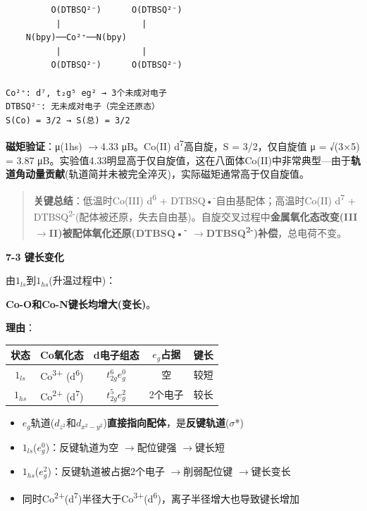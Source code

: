\documentclass[a4paper,11pt]{ctexart}
\providecommand{\tightlist}{\setlength{\itemsep}{0pt}\setlength{\parskip}{0pt}}
\newcounter{none}
\newcommand{\箭}{\ensuremath{\rightarrow}}
\newcommand{\左箭}{\ensuremath{\leftarrow}}
\newcommand{\上箭}{\ensuremath{\uparrow}}
\newcommand{\下箭}{\ensuremath{\downarrow}}
\newcommand{\衡}{\ensuremath{\rightleftharpoons}}
\newcommand{\双箭}{\ensuremath{\leftrightarrow}}
\newcommand{\约等于}{\ensuremath{\approx}}
\newcommand{\小于等于}{\ensuremath{\leq}}
\newcommand{\大于等于}{\ensuremath{\geq}}
\newcommand{\不等于}{\ensuremath{\neq}}
\newcommand{\西格马}{\ensuremath{\sigma}}
\newcommand{\派}{\ensuremath{\pi}}
\begin{document}
\begin{verbatim}
         O(DTBSQ²⁻)      O(DTBSQ²⁻)
          |                |
    N(bpy)──Co²⁺──N(bpy)
          |                |
         O(DTBSQ²⁻)      O(DTBSQ²⁻)

Co²⁺: d⁷, t₂g⁵ eg² → 3个未成对电子
DTBSQ²⁻: 无未成对电子（完全还原态）
S(Co) = 3/2 → S(总) = 3/2
\end{verbatim}

\textbf{磁矩验证}：μ(1hs) \箭 4.33 μB。Co(II) d\textsuperscript{7}高自旋，S = 3/2，仅自旋值 μ = √(3×5) = 3.87 μB。实验值4.33明显高于仅自旋值，这在八面体Co(II)中非常典型---由于\textbf{轨道角动量贡献}(轨道简并未被完全淬灭)，实际磁矩通常高于仅自旋值。

\begin{quote}
\textbf{关键总结}：低温时Co(III) d\textsuperscript{6} + DTBSQ•\textsuperscript{-}自由基配体；高温时Co(II) d\textsuperscript{7} + DTBSQ\textsuperscript{2-}(配体被还原，失去自由基)。自旋交叉过程中\textbf{金属氧化态改变(III \箭 II)被配体氧化还原(DTBSQ•\textsuperscript{-} \箭 DTBSQ\textsuperscript{2-})补偿}，总电荷不变。
\end{quote}

\textbf{7-3 键长变化}

由\(1_{ls}\)到\(1_{hs}\)(升温过程中)：

\textbf{Co-O和Co-N键长均增大(变长)}。

\textbf{理由}：

{\def\LTcaptype{none} %
\begin{longtable}[]{@{}ccccc@{}}
\toprule\noalign{}
状态 & Co氧化态 & d电子组态 & \(e_g\)占据 & 键长 \\
\midrule\noalign{}
\endhead
\bottomrule\noalign{}
\endlastfoot
\(1_{ls}\) & Co\textsuperscript{3+} (d\textsuperscript{6}) & \(t_{2g}^{6}e_{g}^{0}\) & 空 & 较短 \\
\(1_{hs}\) & Co\textsuperscript{2+} (d\textsuperscript{7}) & \(t_{2g}^{5}e_{g}^{2}\) & 2个电子 & 较长 \\
\end{longtable}
}

\begin{itemize}
\tightlist
\item
  \(e_g\)轨道(\(d_{z^2}\)和\(d_{x^2-y^2}\))\textbf{直接指向配体}，是\textbf{反键轨道}(\西格马*)
\item
  \(1_{ls}\)(\(e_{g}^{0}\))：反键轨道为空 \箭 配位键强 \箭 键长短
\item
  \(1_{hs}\)(\(e_{g}^{2}\))：反键轨道被占据2个电子 \箭 削弱配位键 \箭 键长变长
\item
  同时Co\textsuperscript{2+}(d\textsuperscript{7})半径大于Co\textsuperscript{3+}(d\textsuperscript{6})，离子半径增大也导致键长增加
\end{itemize}
\end{document}
